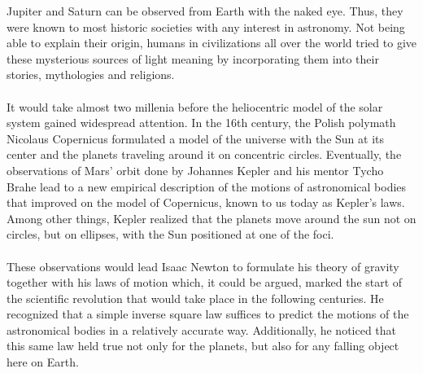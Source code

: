     Jupiter and Saturn can be observed from Earth with the naked eye. Thus, 
    they were known to most historic societies with any interest in astronomy.
    Not being able to explain their origin, humans in civilizations all over 
    the world tried to give these mysterious sources of light meaning by 
    incorporating them into their stories, mythologies and religions. \\
    \\
    It would take almost two millenia before the heliocentric model of the solar 
    system gained widespread attention. In the 16th century, the Polish 
    polymath Nicolaus Copernicus formulated a model of the universe
    with the Sun at its center and the planets traveling around it on 
    concentric circles. 
    Eventually, the observations of Mars' orbit done 
    by Johannes Kepler and his mentor Tycho Brahe lead to a new empirical
    description of the motions of astronomical bodies that improved on the 
    model of Copernicus, known to us today as Kepler's laws. Among other 
    things, Kepler realized that the planets move around the sun not on circles,
    but on ellipses, with the Sun positioned at one of the foci. \\
    \\
    These observations would lead Isaac Newton to formulate his theory of 
    gravity together with his laws of motion
    which, it could be argued, marked the start of the scientific 
    revolution that would take place in the following centuries. 
    He recognized that a simple inverse square law suffices to predict 
    the motions of the astronomical bodies in a relatively accurate way.
    Additionally, he noticed that this
    same law held true not only for the planets, but also for any falling 
    object here on Earth. 

